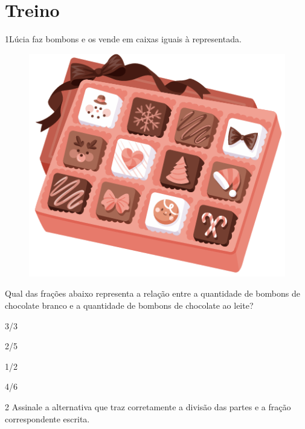 \pagebreak
\section*{Treino}

\num{1}Lúcia faz bombons e os vende em caixas iguais à representada.

\begin{figure}[htpb!]
\centering
\includegraphics[width=\textwidth]{../ilustracoes/MAT5/SAEB_5ANO_MAT_figura76.png}
\end{figure}

Qual das frações abaixo representa a relação entre a quantidade de
bombons de chocolate branco e a quantidade de bombons de chocolate ao leite?

\begin{escolha}
\item
  3/3
\item
  2/5
\item
  1/2
\item
  4/6
\end{escolha}


\pagebreak

\num{2} Assinale a alternativa que traz corretamente a divisão das partes e a fração correspondente escrita.

